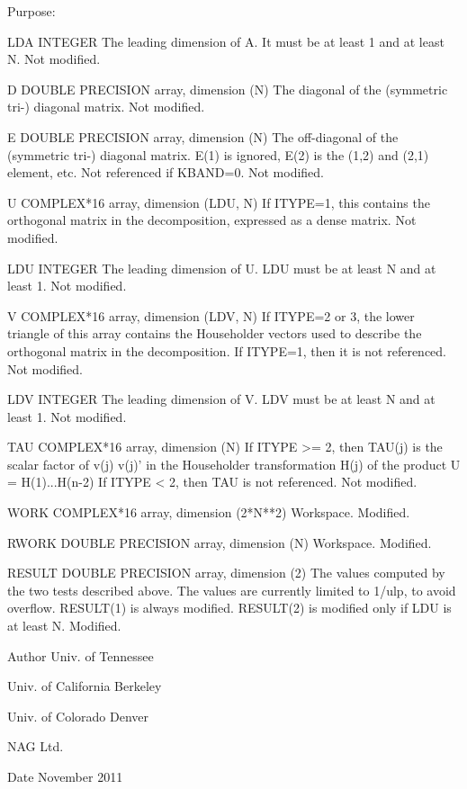 \begin{DoxyParagraph}{Purpose\+: }
\begin{DoxyVerb}
  LDA     INTEGER
          The leading dimension of A.  It must be at least 1
          and at least N.
          Not modified.

  D       DOUBLE PRECISION array, dimension (N)
          The diagonal of the (symmetric tri-) diagonal matrix.
          Not modified.

  E       DOUBLE PRECISION array, dimension (N)
          The off-diagonal of the (symmetric tri-) diagonal matrix.
          E(1) is ignored, E(2) is the (1,2) and (2,1) element, etc.
          Not referenced if KBAND=0.
          Not modified.

  U       COMPLEX*16 array, dimension (LDU, N)
          If ITYPE=1, this contains the orthogonal matrix in
          the decomposition, expressed as a dense matrix.
          Not modified.

  LDU     INTEGER
          The leading dimension of U.  LDU must be at least N and
          at least 1.
          Not modified.

  V       COMPLEX*16 array, dimension (LDV, N)
          If ITYPE=2 or 3, the lower triangle of this array contains
          the Householder vectors used to describe the orthogonal
          matrix in the decomposition.  If ITYPE=1, then it is not
          referenced.
          Not modified.

  LDV     INTEGER
          The leading dimension of V.  LDV must be at least N and
          at least 1.
          Not modified.

  TAU     COMPLEX*16 array, dimension (N)
          If ITYPE >= 2, then TAU(j) is the scalar factor of
          v(j) v(j)' in the Householder transformation H(j) of
          the product  U = H(1)...H(n-2)
          If ITYPE < 2, then TAU is not referenced.
          Not modified.

  WORK    COMPLEX*16 array, dimension (2*N**2)
          Workspace.
          Modified.

  RWORK   DOUBLE PRECISION array, dimension (N)
          Workspace.
          Modified.

  RESULT  DOUBLE PRECISION array, dimension (2)
          The values computed by the two tests described above.  The
          values are currently limited to 1/ulp, to avoid overflow.
          RESULT(1) is always modified.  RESULT(2) is modified only
          if LDU is at least N.
          Modified.\end{DoxyVerb}
 
\end{DoxyParagraph}
\begin{DoxyAuthor}{Author}
Univ. of Tennessee 

Univ. of California Berkeley 

Univ. of Colorado Denver 

N\+A\+G Ltd. 
\end{DoxyAuthor}
\begin{DoxyDate}{Date}
November 2011 
\end{DoxyDate}
\hypertarget{group__complex16__eig_gacb29438aa9a7dd450f3db905ef4a8daa}{}
